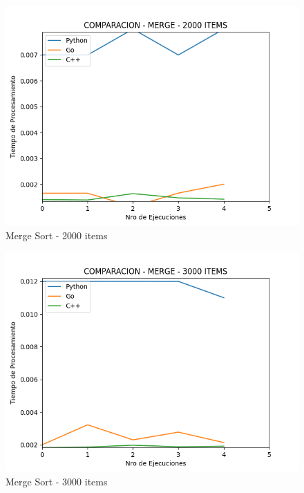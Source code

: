 \documentclass[12pt]{article} %
\begin{document}
    \begin{figure}[H]
    \centering
    \includegraphics[width=\textwidth]{merge_2000}
    \caption{Merge Sort - 2000 items}
    \end{figure}
    
    \vspace{5mm}
    
    \begin{figure}[H]
    \centering
    \includegraphics[width=\textwidth]{merge_3000}
    \caption{Merge Sort - 3000 items}
    \end{figure}
    
    \vspace{5mm}
    
\end{document}
